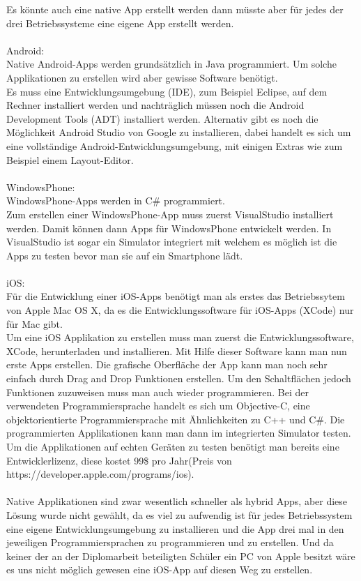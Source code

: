 Es könnte auch eine native App erstellt werden dann müsste aber für jedes der drei Betriebssysteme eine eigene App erstellt werden.\\
\\
Android:\\
Native Android-Apps werden grundsätzlich in Java programmiert. Um solche Applikationen zu erstellen wird aber gewisse Software benötigt.\\
Es muss eine Entwicklungsumgebung (IDE), zum Beispiel Eclipse, auf dem Rechner installiert werden und nachträglich müssen noch die Android Development Tools (ADT) installiert werden. Alternativ gibt es noch die Möglichkeit Android Studio von Google zu installieren, dabei handelt es sich um eine vollständige Android-Entwicklungsumgebung, mit einigen Extras wie zum Beispiel einem Layout-Editor.\\
\\
WindowsPhone:\\
WindowsPhone-Apps werden in C\# programmiert.\\
Zum erstellen einer WindowsPhone-App muss zuerst VisualStudio installiert werden. Damit können dann Apps für WindowsPhone entwickelt werden. In VisualStudio ist sogar ein Simulator integriert mit welchem es möglich ist die Apps zu testen bevor man sie auf ein Smartphone lädt.\\
\\
iOS:\\
Für die Entwicklung einer iOS-Apps benötigt man als erstes das Betriebssytem von Apple Mac OS X, da es die Entwicklungssoftware für iOS-Apps (XCode) nur für Mac gibt.\\
Um eine iOS Applikation zu erstellen muss man zuerst die Entwicklungssoftware, XCode, herunterladen und installieren. Mit Hilfe dieser Software kann man nun erste Apps erstellen. Die grafische Oberfläche der App kann man noch sehr einfach durch Drag and Drop Funktionen erstellen. Um den Schaltflächen jedoch Funktionen zuzuweisen muss man auch wieder programmieren. Bei der verwendeten Programmiersprache handelt es sich um Objective-C, eine objektorientierte Programmiersprache mit Ähnlichkeiten zu C++ und C\#.
Die programmierten Applikationen kann man dann im integrierten Simulator testen.
Um die Applikationen auf echten Geräten zu testen benötigt man bereits eine Entwicklerlizenz, diese kostet 99\$ pro Jahr(Preis von https://developer.apple.com/programs/ios).\\
\\
Native Applikationen sind zwar wesentlich schneller als hybrid Apps, aber diese Lösung wurde nicht gewählt, da es viel zu aufwendig ist für jedes Betriebssystem eine eigene Entwicklungsumgebung zu installieren und die App drei mal in den jeweiligen Programmiersprachen zu programmieren und zu erstellen. Und da keiner der an der Diplomarbeit beteiligten Schüler ein PC von Apple besitzt wäre es uns nicht möglich gewesen eine iOS-App auf diesen Weg zu erstellen.\\

